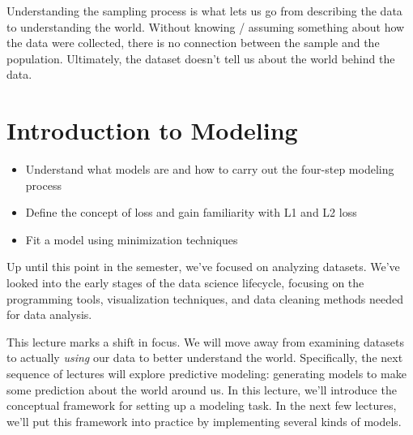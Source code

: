 \documentclass[
  letterpaper,
  DIV=11,
  numbers=noendperiod]{scrreprt}
\providecommand{\tightlist}{%
  \setlength{\itemsep}{0pt}\setlength{\parskip}{0pt}}\usepackage{longtable,booktabs,array}
\begin{document}
Understanding the sampling process is what lets us go from describing
the data to understanding the world. Without knowing / assuming
something about how the data were collected, there is no connection
between the sample and the population. Ultimately, the dataset doesn't
tell us about the world behind the data.


\hypertarget{introduction-to-modeling}{%
\chapter{Introduction to Modeling}\label{introduction-to-modeling}}

\begin{tcolorbox}[enhanced jigsaw, bottomrule=.15mm, breakable, colbacktitle=quarto-callout-note-color!10!white, coltitle=black, opacitybacktitle=0.6, colback=white, bottomtitle=1mm, toprule=.15mm, title=\textcolor{quarto-callout-note-color}{\faInfo}\hspace{0.5em}{Note}, titlerule=0mm, arc=.35mm, leftrule=.75mm, toptitle=1mm, colframe=quarto-callout-note-color-frame, rightrule=.15mm, opacityback=0, left=2mm]

\begin{itemize}
\tightlist
\item
  Understand what models are and how to carry out the four-step modeling
  process
\item
  Define the concept of loss and gain familiarity with L1 and L2 loss
\item
  Fit a model using minimization techniques
\end{itemize}

\end{tcolorbox}

Up until this point in the semester, we've focused on analyzing
datasets. We've looked into the early stages of the data science
lifecycle, focusing on the programming tools, visualization techniques,
and data cleaning methods needed for data analysis.

This lecture marks a shift in focus. We will move away from examining
datasets to actually \emph{using} our data to better understand the
world. Specifically, the next sequence of lectures will explore
predictive modeling: generating models to make some prediction about the
world around us. In this lecture, we'll introduce the conceptual
framework for setting up a modeling task. In the next few lectures,
we'll put this framework into practice by implementing several kinds of
models.
\end{document}

